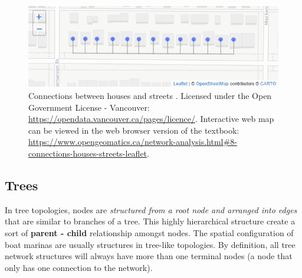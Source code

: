 \documentclass[
]{book}
\begin{document}
\begin{figure}
\includegraphics[width=8.56in]{images/08-Connections-between-houses-and-streets-static} \caption{Connections between houses and streets \citep{city_of_vancouver_open_nodate}. Licensed under the Open Government License - Vancouver: \url{https://opendata.vancouver.ca/pages/licence/}. Interactive web map can be viewed in the web browser version of the textbook: \url{https://www.opengeomatics.ca/network-analysis.html\#8-connections-houses-streets-leaflet}.}\label{fig:8-connections-houses-streets-leaflet}
\end{figure}

\subsection{Trees}\label{trees}

In tree topologies, nodes are \emph{structured from a root node and arranged into edges} that are similar to branches of a tree. This highly hierarchical structure create a sort of \textbf{parent - child} relationship amongst nodes. The spatial configuration of boat marinas are usually structures in tree-like topologies. By definition, all tree network structures will always have more than one terminal nodes (a node that only has one connection to the network).
\end{document}
